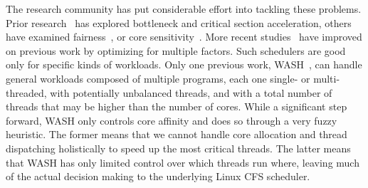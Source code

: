 


The research community has put considerable effort into tackling these problems. Prior research~\cite{han2018multicore,chronaki2017task,joao2012bottleneck,suleman2009accelerating,du2013criticality} has explored bottleneck and critical section acceleration, others have examined fairness~\cite{zahedi2018amdahl,wang2016rebudget,van2012scheduling,li2009efficient,li2007efficient}, or core sensitivity~\cite{cao2012yin,kumar2004single,becchi2006dynamic}. More recent studies~\cite{kim2018exploring,kim2016fairness,saez2012leveraging,van2013fairness,joao2013utility} have improved on previous work by optimizing for multiple factors.
Such schedulers are good only for specific kinds of workloads. Only one previous work, WASH~\cite{jibaja2016portable}, can handle general workloads composed of multiple programs, each one single- or multi-threaded, with potentially unbalanced threads, and with a total number of threads that may be higher than the number of cores. While a significant step forward, WASH only controls core affinity and does so through a very fuzzy heuristic. The former means that we cannot handle core allocation and thread dispatching holistically to speed up the most critical threads. The latter means that WASH has only limited control over which threads run where, leaving much of the actual decision making to the underlying Linux CFS scheduler.

